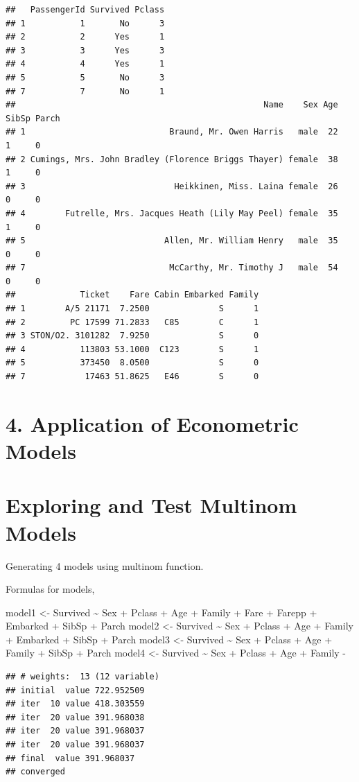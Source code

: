 \documentclass[
]{article}
\begin{document}
\begin{verbatim}
##   PassengerId Survived Pclass
## 1           1       No      3
## 2           2      Yes      1
## 3           3      Yes      3
## 4           4      Yes      1
## 5           5       No      3
## 7           7       No      1
##                                                  Name    Sex Age SibSp Parch
## 1                             Braund, Mr. Owen Harris   male  22     1     0
## 2 Cumings, Mrs. John Bradley (Florence Briggs Thayer) female  38     1     0
## 3                              Heikkinen, Miss. Laina female  26     0     0
## 4        Futrelle, Mrs. Jacques Heath (Lily May Peel) female  35     1     0
## 5                            Allen, Mr. William Henry   male  35     0     0
## 7                             McCarthy, Mr. Timothy J   male  54     0     0
##             Ticket    Fare Cabin Embarked Family
## 1        A/5 21171  7.2500              S      1
## 2         PC 17599 71.2833   C85        C      1
## 3 STON/O2. 3101282  7.9250              S      0
## 4           113803 53.1000  C123        S      1
## 5           373450  8.0500              S      0
## 7            17463 51.8625   E46        S      0
\end{verbatim}

\hypertarget{application-of-econometric-models}{%
\section{4. Application of Econometric
Models}\label{application-of-econometric-models}}

\hypertarget{exploring-and-test-multinom-models}{%
\section{Exploring and Test Multinom
Models}\label{exploring-and-test-multinom-models}}

Generating 4 models using multinom function.

Formulas for models,

model1 \textless- Survived \textasciitilde{} Sex + Pclass + Age + Family
+ Fare + Farepp + Embarked + SibSp + Parch model2 \textless- Survived
\textasciitilde{} Sex + Pclass + Age + Family + Embarked + SibSp + Parch
model3 \textless- Survived \textasciitilde{} Sex + Pclass + Age + Family
+ SibSp + Parch model4 \textless- Survived \textasciitilde{} Sex +
Pclass + Age + Family -

\begin{verbatim}
## # weights:  13 (12 variable)
## initial  value 722.952509 
## iter  10 value 418.303559
## iter  20 value 391.968038
## iter  20 value 391.968037
## iter  20 value 391.968037
## final  value 391.968037 
## converged
\end{verbatim}
\end{document}

